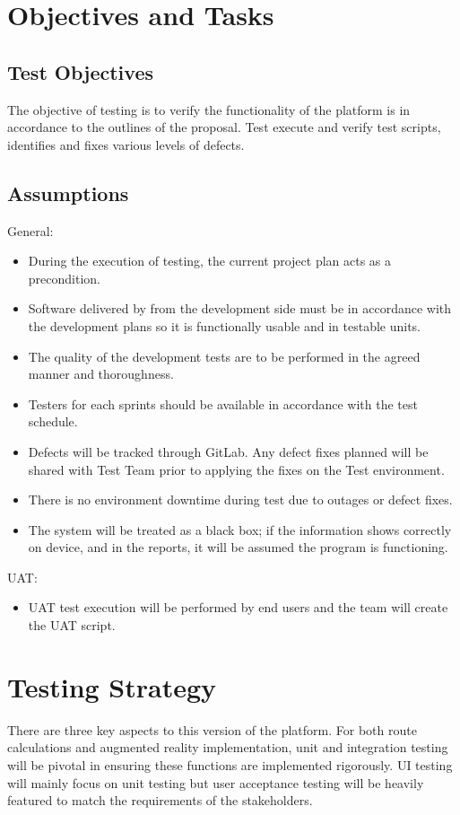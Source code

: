 \section*{Objectives and Tasks}
\subsection*{Test Objectives}
The objective of testing is to verify the functionality of the platform is in accordance to the outlines of the proposal. Test execute and verify test scripts, identifies and fixes various levels of defects.

\subsection*{Assumptions}
General:
\begin{itemize}
    \item During the execution of testing, the current project plan acts as a precondition.
    \item Software delivered by from the development side must be in accordance with the development plans so it is functionally usable and in testable units. 
    \item The quality of the development tests are to be performed in the agreed manner and thoroughness.
    \item Testers for each sprints should be available in accordance with the test schedule. 
    \item Defects will be tracked through GitLab. Any defect fixes planned will be shared with Test Team prior to applying the fixes on the Test environment.
    \item There is no environment downtime during test due to outages or defect fixes.
    \item The system will be treated as a black box; if the information shows correctly on device, and in the reports, it will be assumed the program is functioning.
\end{itemize}

UAT:
\begin{itemize}
    \item UAT test execution will be performed by end users and the team will create the UAT script.
\end{itemize}

\section*{Testing Strategy}
There are three key aspects to this version of the platform. For both route calculations and augmented reality implementation, unit and integration testing will be pivotal in ensuring these functions are implemented rigorously. UI testing will mainly focus on unit testing but user acceptance testing will be heavily featured to match the requirements of the stakeholders.

